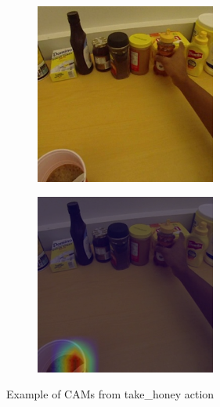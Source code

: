 \documentclass[10pt,twocolumn,hidelinks,letterpaper]{article}
\begin{document}
\begin{figure}[t]
\begin{subfigure}{.35\linewidth}
  \end{subfigure}
  \begin{subfigure}{.35\linewidth}
  	\includegraphics[width=\linewidth]{images/Cams1/S2_take_honey/rgb0007.png}
  \end{subfigure}
  \begin{subfigure}{.35\linewidth}
  	\includegraphics[width=\linewidth]{images/Cams1/S2_take_honey/rgb0007_CAM.png}
  \end{subfigure}
  \caption{Example of CAMs from take\_honey action}
  \label{cams1_2}
\end{figure}
\end{document}
